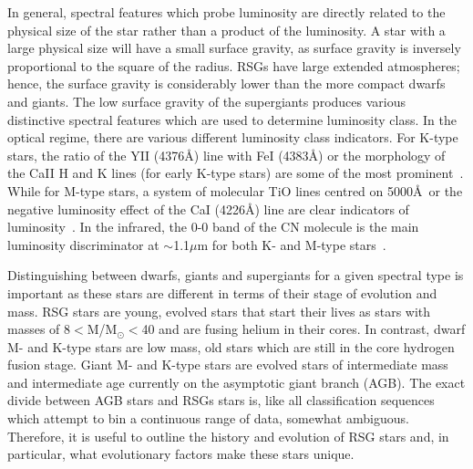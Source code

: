 \documentclass[a4paper,12pt]{article}
\begin{document}
In general, spectral features which probe luminosity are directly related to the physical size of the star rather than a product of the luminosity.
A star with a large physical size will have a small surface gravity, as surface gravity is inversely proportional to the square of the radius. 
RSGs have large extended atmospheres; hence, the surface gravity is considerably lower than the more compact dwarfs and giants.
The low surface gravity of the supergiants produces various distinctive spectral features which are used to determine luminosity class. 
In the optical regime, there are various different luminosity class indicators.
For K-type stars, the ratio of the YII (4376\AA) line with FeI (4383\AA) or the morphology of the CaII H and K lines (for early K-type stars) are some of the most prominent~\citep{b:GrayCorbally}.
While for M-type stars, a system of molecular TiO lines centred on 5000\AA ~or the negative luminosity effect of the CaI (4226\AA) line are clear indicators of luminosity~\citep{b:GrayCorbally}. 
In the infrared, the 0-0 band of the CN molecule is the main luminosity discriminator at $\sim$1.1$\mu$m for both K- and M-type stars~\citep{b:GrayCorbally}.




Distinguishing between dwarfs, giants and supergiants for a given spectral type is important as these stars are different in terms of their stage of evolution and mass. 
RSG stars are young, evolved stars that start their lives as stars with masses of 8$<$M/M$_{\odot}<$40 and are fusing helium in their cores. 
In contrast, dwarf M- and K-type stars are low mass, old stars which are still in the core hydrogen fusion stage. 
Giant M- and K-type stars are evolved stars of intermediate mass and intermediate age currently on the asymptotic giant branch (AGB). 
The exact divide between AGB stars and RSGs stars is, like all classification sequences which attempt to bin a continuous range of data, somewhat ambiguous.
Therefore, it is useful to outline the history and evolution of RSG stars and, in particular, what evolutionary factors make these stars unique. 
\end{document}
